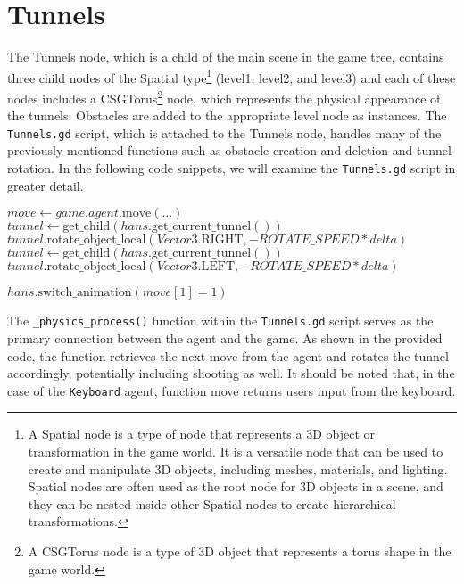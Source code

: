 \section{Tunnels}
\label{tunnel_script}
The Tunnels node, which is a child of the main scene in the game tree, contains three child nodes of the Spatial type\footnote{A Spatial node is a type of node that represents a 3D object or transformation in the game world. It is a versatile node that can be used to create and manipulate 3D objects, including meshes, materials, and lighting. Spatial nodes are often used as the root node for 3D objects in a scene, and they can be nested inside other Spatial nodes to create hierarchical transformations.} (level1, level2, and level3) and each of these nodes includes a CSGTorus\footnote{ A CSGTorus node is a type of 3D object that represents a torus shape in the game world.} node, which represents the physical appearance of the tunnels. Obstacles are added to the appropriate level node as instances. The \texttt{Tunnels.gd} script, which is attached to the Tunnels node, handles many of the previously mentioned functions such as obstacle creation and deletion and tunnel rotation. In the following code snippets, we will examine the \texttt{Tunnels.gd} script in greater detail.

\begin{algorithm}
\begin{algorithmic}[1]
\State $move \gets game.agent.\text{move}(\dots)$
	\State $tunnel \gets \text{get\_child}(hans.\text{get\_current\_tunnel}())$
	\State $tunnel.\text{rotate\_object\_local}(Vector3.\text{RIGHT},-ROTATE\_SPEED * delta)$
	\State $tunnel \gets \text{get\_child}(hans.\text{get\_current\_tunnel}())$
	\State $tunnel.\text{rotate\_object\_local}(Vector3.\text{LEFT},-ROTATE\_SPEED * delta)$
\EndIf

	\State $hans.\text{switch\_animation}(move[1] = 1)$
\EndIf
\EndFunction
\end{algorithmic}
\end{algorithm}

The \texttt{\_physics\_process()} function within the \texttt{Tunnels.gd} script serves as the primary connection between the agent and the game. As shown in the provided code, the function retrieves the next move from the agent and rotates the tunnel accordingly, potentially including shooting as well. It should be noted that, in the case of the \texttt{Keyboard} agent, function move returns users input from the keyboard.

